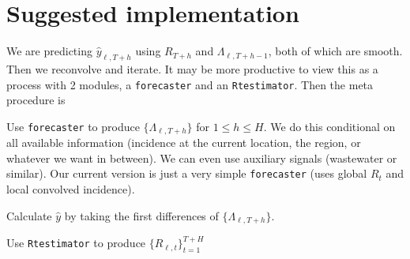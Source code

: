 \documentclass[12pt]{article}
\begin{document}
\section{Suggested implementation}

We are predicting $\hat{y}_{\ell,T + h}$ using $R_{T+h}$ and
$\Lambda_{\ell,T+h-1}$, both of which are smooth. Then we reconvolve and
iterate. It may be more productive to view this as a process with 2 modules, a
\texttt{forecaster} and an \texttt{Rtestimator}. Then the meta procedure is

\benum[nosep]
\item Use \texttt{forecaster} to produce $\{\Lambda_{\ell, T+h}\}$ for $1\leq h
\leq H$. We do this conditional on all available information (incidence at the
current location, the region, or whatever we want in between). We can even use
auxiliary signals (wastewater or similar). Our current version is just a very
simple \texttt{forecaster} (uses global $R_t$ and local convolved incidence).
\item Calculate $\hat{y}$ by taking the first differences of $\{\Lambda_{\ell, T+h}\}$.
\item Use \texttt{Rtestimator} to produce $\{R_{\ell, t}\}_{t=1}^{T+H}$
\eenum
\end{document}
